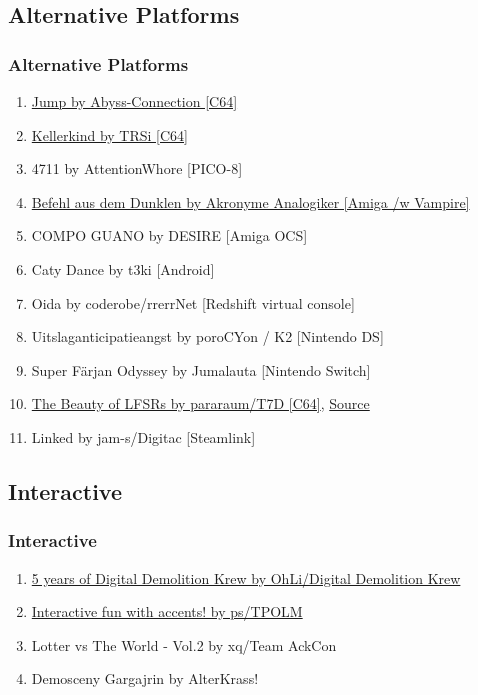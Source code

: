 \documentclass{beamer}
\begin{document}
\subsection{Alternative Platforms}
\begin{frame}
  \frametitle{Alternative Platforms}
  \begin{enumerate}
  \item \href{https://www.pouet.net/prod.php?which=77670}{Jump by Abyss-Connection [C64]}
  \item \href{https://www.pouet.net/prod.php?which=77701}{Kellerkind by TRSi [C64]}
  \item 4711 by AttentionWhore [PICO-8]
  \item \href{https://www.twitch.tv/videos/298895783?t=04h56m03s}{Befehl aus dem Dunklen by Akronyme Analogiker [Amiga /w Vampire]}
  \item COMPO GUANO by DESIRE [Amiga OCS]
  \item Caty Dance by t3ki [Android]
  \item Oida by coderobe/rrerrNet [Redshift virtual console]
  \item Uitslaganticipatieangst by poroCYon / K2 [Nintendo DS]
  \item Super Färjan Odyssey by Jumalauta [Nintendo Switch]
  \item \href{https://csdb.dk/release/?id=167237}{The Beauty of LFSRs by pararaum/T7D [C64]}, \href{https://github.com/pararaum/beauty_of_LFSR}{Source}
  \item Linked by jam-s/Digitac [Steamlink]
  \end{enumerate}
\end{frame}


\subsection{Interactive}
\begin{frame}
  \frametitle{Interactive}
  \begin{enumerate}
  \item \href{https://demozoo.org/productions/191979/}{5 years of Digital Demolition Krew by OhLi/Digital Demolition Krew}
  \item \href{https://www.twitch.tv/videos/298895783?t=04h11m30s}{Interactive fun with accents! by ps/TPOLM}
  \item Lotter vs The World - Vol.2 by xq/Team AckCon
  \item Demosceny Gargajrin by AlterKrass!
  \end{enumerate}
\end{frame}
\end{document}
